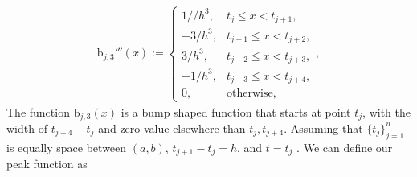 \documentclass{iitthesis}
\theoremstyle{definition}
\theoremstyle{remark}
\begin{document}
\begin{align*}
  \text{b}_{j,3}'''(x):= \begin{cases} \displaystyle 1//h^3, & t_{j} \le x < t_{j+1},\\[1ex]
\displaystyle -3/h^3, & t_{j+1} \le x < t_{j+2},\\[1ex]
\displaystyle 3/h^3, & t_{j+2} \le x < t_{j+3},\\[1ex]
\displaystyle -1/h^3, & t_{j+3} \le x < t_{j+4},\\[1ex]
\displaystyle  0, & \text{otherwise},
\end{cases},
\end{align*}
The function $\text{b}_{j,3}(x)$ is a bump shaped function that starts at point $t_j$, with the width of $t_{j+4}-t_{j}$ and zero value elsewhere than $t_{j}, t_{j+4}$. Assuming that $\{t_{j}\}_{j=1}^{n}$ is equally space between $(a,b)$, $t_{j+1}-t_{j}=h$, and $t=t_{j}$ . We can define our peak function as
\end{document}
